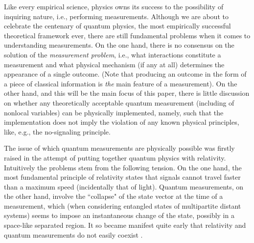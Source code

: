 \documentclass[a4paper,twocolumn,11pt,accepted=2024-02-14]{quantumarticle}
\begin{document}
Like every empirical science, physics owns its success to the possibility of inquiring nature, i.e., performing measurements. Although we are about to celebrate the centenary of quantum physics, the most empirically successful theoretical framework ever, there are still fundamental problems when it comes to understanding measurements. On the one hand, there is no consensus on the solution of the \textit{measurement problem}, i.e., what interactions constitute a measurement and what physical mechanism (if any at all) determines the appearance of a single outcome. (Note that producing an outcome in the form of a piece of classical information is \textit{the} main feature of a measurement). On the other hand, and this will be the main focus of this paper, there is little discussion on whether any theoretically acceptable quantum measurement (including of nonlocal variables) can be physically implemented, namely, such that the implementation does not imply the violation of any known physical principles, like, e.g., the no-signaling principle. 

The issue of which quantum measurements are physically possible was firstly raised in the attempt of putting together quantum physics with relativity. Intuitively the problems stem from the following tension. On the one hand, the most fundamental principle of relativity states that signals cannot travel faster than a maximum speed (incidentally that of light). Quantum measurements, on the other hand, involve the  ``collapse" of the state vector at the time of a measurement, which (when considering entangled states of multipartite distant systems) seems to impose an instantaneous change of the state, possibly in a space-like separated region. It so became manifest quite early that relativity and quantum measurements do not easily coexist \cite{landau1931erweiterung, schilpp1949library, hellwig1970formal, aharonov1980states, aharonov1981can, guerreiro2012single}. 
\end{document}

